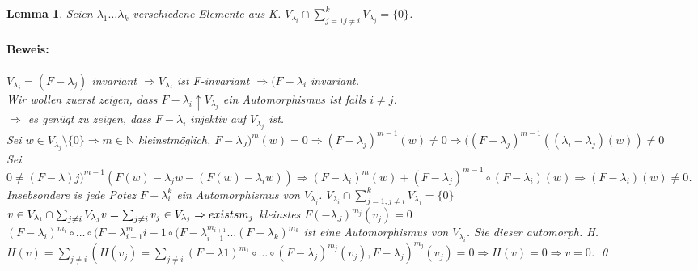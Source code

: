 \documentclass{report}
\newcommand{\lb}{\lambda}
\newcommand{\N}{\mathbb{N}}
\theoremstyle{customrem}
\theoremstyle{customdef}
\newtheorem{lemma}[definition]{Lemma}
\renewenvironment{proof}{\paragraph{Beweis: }}{\qed}
\theoremstyle{customenv}
\begin{document}
\begin{lemma}
  Seien \(\lb_1 \dots \lb_k\) verschiedene Elemente aus K.
  \(V_{\lb_i} \cap \sum_{j=1 j\neq i}^k V_{\lb_j} = \{0\}\).
  \begin{proof}
    \(V_{\lb_j} = (F - \lb_j)\) invariant \(\Rightarrow V_{\lb_j}\) ist
    F-invariant \(\Rightarrow (F-\lb_i\) invariant.\\
    Wir wollen zuerst zeigen, dass  \(F - \lb_i \uparrow V_{\lb_j}\) ein
    Automorphismus ist falls \(i \neq j\).\\
    \(\Rightarrow\) es gen\"ugt zu zeigen, dass \(F - \lb_i\) injektiv auf
    \(V_{\lb_j}\) ist.\\
    Sei \(w \in V_{\lb_j} \setminus \{0\} \Rightarrow m \in \N\) kleinstm\"oglich,
    \(F - \lb_J)^m(w) = 0 \Rightarrow (F - \lb_j)^{m - 1}(w) \neq 0
    \Rightarrow ((F - \lb_j)^{m-1}((\lb_i - \lb_j)(w)) \neq 0\)\\
    Sei \(0 \neq (F - \lb)j)^{m-1}(F(w) - \lb_j w - (F(w) - \lb_i w))
    \Rightarrow (F - \lb_i)^m(w) + (F - \lb_j)^{m-1} \circ (F - \lb_i)(w)
    \Rightarrow (F- \lb_i)(w) \neq 0\).\\
    Insebsondere is jede Potez \(F - \lb_i^k\) ein Automorphismus von
    \(V_{\lb_j}\). \(V_{\lb_i} \cap \sum_{j=1, j\neq i}^k V_{\lb_j} = \{0\}\)
    \(v \in V_{\lb_i} \cap \sum_{j \neq i} V_{\lb_j}\\
    v = \sum_{j \neq i} v_j \in V_{\lb_j}
    \Rightarrow exist sm_j\) kleinstes \(F( - \lb_J)^{m_j}(v_j) = 0\)\\
    \((F - \lb_i)^{m_i} \circ \dots \circ (F - \lb_{i - 1}^{m}{i-1} \circ
    (F - \lb_{i-1}^{m_{i+1}} \dots (F - \lb_{k})^{m_k}\) ist eine Automorphismus
    von \(V_{\lb_i}\). Sie dieser automorph. H. \(H(v) = \sum_{j \neq i}(H(v_j)
    = \sum_{j \neq i} (F - \lb1)^{m_1} \circ \dots \circ (F - \lb_j)^{m_j}(v_j), F - \lb_j)^{m_j}(v_j) = 0
    \Rightarrow H(v) = 0 \Rightarrow v = 0\).
    \end{proof}
\end{lemma}




\newpage
\renewcommand{\listtheoremname}{Satz- und Definitionsverzeichnis}
\newpage
\printindex
\end{document}
